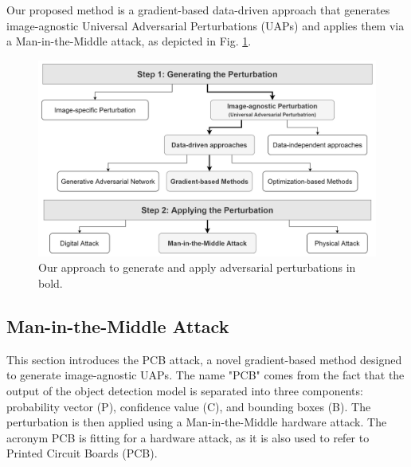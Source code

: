 





Our proposed method is a gradient-based data-driven approach that generates image-agnostic Universal Adversarial Perturbations (UAPs) and applies them via a Man-in-the-Middle attack, as depicted in Fig. \ref{fig:attack}.

\begin{figure}[bthp]
    \centering
    \includegraphics[width=0.7\linewidth]{figures/chapter_detection/attack_process.jpg}
    \caption{Our approach to generate and apply adversarial perturbations in bold.}
    \label{fig:attack}
\end{figure}


\subsection{Man-in-the-Middle Attack}

This section introduces the PCB attack, a novel gradient-based method designed to generate image-agnostic UAPs. The name "PCB" comes from the fact that the output of the object detection model is separated into three components: probability vector (P), confidence value (C), and bounding boxes (B). The perturbation is then applied using a Man-in-the-Middle hardware attack. The acronym PCB is fitting for a hardware attack, as it is also used to refer to Printed Circuit Boards (PCB).

